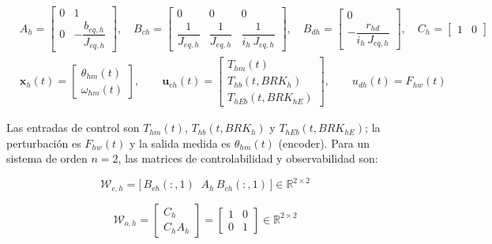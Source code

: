 \documentclass[12pt, a4paper]{article}
\begin{document}
\begin{equation}
    \label{eq:ss-hoist}
    \begin{aligned}
    &A_h =
    \begin{bmatrix}
        0 & 1 \\[4pt]
        0 & -\dfrac{b_{eq,h}}{J_{eq,h}}
    \end{bmatrix}, \quad
    B_{ch} =
    \begin{bmatrix}
        0 & 0 & 0 \\[4pt]
        \dfrac{1}{J_{eq,h}} & \dfrac{1}{J_{eq,h}} & \dfrac{1}{i_h\,J_{eq,h}}
    \end{bmatrix}, \quad
    B_{dh} =
    \begin{bmatrix} 0 \\[4pt] -\dfrac{r_{hd}}{i_h\,J_{eq,h}} \end{bmatrix}, \quad
    C_h =
    \begin{bmatrix} 1 & 0 \end{bmatrix} \\[10pt]
    &\mathbf{x}_h(t) =
    \begin{bmatrix} \theta_{hm}(t) \\ \omega_{hm}(t) \end{bmatrix}, \qquad
    \mathbf{u}_{ch}(t) =
    \begin{bmatrix} T_{hm}(t) \\ T_{hb}(t,BRK_h) \\ T_{hEb}(t,BRK_{hE}) \end{bmatrix}, \qquad
    u_{dh}(t) = F_{hw}(t)
    \end{aligned}
\end{equation}

Las entradas de control son $T_{hm}(t)$, $T_{hb}(t,BRK_h)$ y $T_{hEb}(t,BRK_{hE})$; la
perturbación es $F_{hw}(t)$ y la salida medida es $\theta_{hm}(t)$ (encoder). Para un
sistema de orden $n=2$, las matrices de controlabilidad y observabilidad son:

\begin{equation}
    \label{eq:wc-h}
    \mathcal{W}_{c,h} = \bigl[\,B_{ch}(:,1)\;\; A_h\,B_{ch}(:,1)\,\bigr]
    \in \mathbb{R}^{2\times 2}
\end{equation}

\begin{equation}
    \label{eq:wo-h}
    \mathcal{W}_{o,h} =
    \begin{bmatrix} C_h \\ C_h A_h \end{bmatrix}
    = \begin{bmatrix} 1 & 0 \\ 0 & 1 \end{bmatrix}
    \in \mathbb{R}^{2\times 2}
\end{equation}
\end{document}
